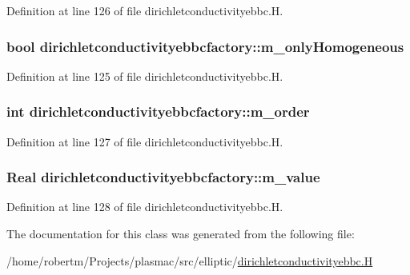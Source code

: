 Definition at line 126 of file dirichletconductivityebbc.\+H.

\subsubsection[{\texorpdfstring{m\+\_\+only\+Homogeneous}{m_onlyHomogeneous}}]{\setlength{\rightskip}{0pt plus 5cm}bool dirichletconductivityebbcfactory\+::m\+\_\+only\+Homogeneous\hspace{0.3cm}{\ttfamily [private]}}\hypertarget{classdirichletconductivityebbcfactory_adbdd77db78d43e00b5f940e8d6bb334f}{}\label{classdirichletconductivityebbcfactory_adbdd77db78d43e00b5f940e8d6bb334f}


Definition at line 125 of file dirichletconductivityebbc.\+H.

\subsubsection[{\texorpdfstring{m\+\_\+order}{m_order}}]{\setlength{\rightskip}{0pt plus 5cm}int dirichletconductivityebbcfactory\+::m\+\_\+order\hspace{0.3cm}{\ttfamily [private]}}\hypertarget{classdirichletconductivityebbcfactory_abb1928dc2e08dee7c27327904ce1b354}{}\label{classdirichletconductivityebbcfactory_abb1928dc2e08dee7c27327904ce1b354}


Definition at line 127 of file dirichletconductivityebbc.\+H.

\subsubsection[{\texorpdfstring{m\+\_\+value}{m_value}}]{\setlength{\rightskip}{0pt plus 5cm}Real dirichletconductivityebbcfactory\+::m\+\_\+value\hspace{0.3cm}{\ttfamily [private]}}\hypertarget{classdirichletconductivityebbcfactory_a057d4ad213c131c82f616bf5f8ef925a}{}\label{classdirichletconductivityebbcfactory_a057d4ad213c131c82f616bf5f8ef925a}


Definition at line 128 of file dirichletconductivityebbc.\+H.



The documentation for this class was generated from the following file\+:\begin{DoxyCompactItemize}
\item 
/home/robertm/\+Projects/plasmac/src/elliptic/\hyperlink{dirichletconductivityebbc_8H}{dirichletconductivityebbc.\+H}\end{DoxyCompactItemize}
